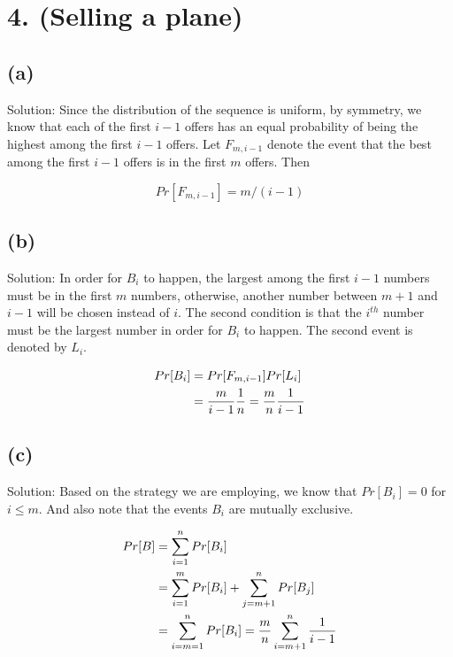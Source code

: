 \documentclass[10pt]{537homework}
\author{Peilun Dai}
\begin{document}
\section*{4. (Selling a plane) }


\subsection*{(a)}

Solution: Since the distribution of the sequence is uniform, by symmetry, we know that each of the first $i-1$ offers has an equal probability of being the highest among the first $i-1$ offers. Let $F_{m, i-1}$ denote the event that the best among the first $i-1$ offers is in the first $m$ offers. Then 

$$Pr[F_{m, i-1}] = m/(i-1)$$


\subsection*{(b)}

Solution: In order for $B_i$ to happen, the largest among the first $i-1$ numbers must be in the first $m$ numbers, otherwise, another number between $m+1$ and $i-1$ will be chosen instead of $i$. The second condition is that the $i^{th}$ number must be the largest number in order for $B_i$ to happen. The second event is denoted by $L_i$.

\begin{align*}
  Pr[B_i]   & = Pr[F_{m, i-1}] Pr[L_i] \\
            & = {m \over i-1} {1 \over n} = {m \over n}{1 \over i-1}
\end{align*}



\subsection*{(c)}

Solution: Based on the strategy we are employing, we know that $Pr[B_i] = 0$ for $i \leq m$. And also note that the events $B_i$ are mutually exclusive. 

\begin{align*}
  Pr[B]     & = \sum_{i=1}^n Pr[B_i] \\
            & = \sum_{i=1}^{m} Pr[B_i] + \sum_{j=m+1}^{n} Pr[B_j] \\
            & = \sum_{i=m=1}^n Pr[B_i] = {m \over n}\sum_{i=m+1}^n {1 \over i-1}
\end{align*}
\end{document}
